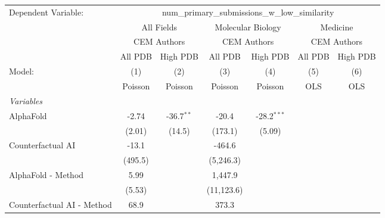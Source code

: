 \begingroup
\centering
\begin{tabular}{lcccccc}
   \tabularnewline \midrule \midrule
   Dependent Variable: & \multicolumn{6}{c}{num\_primary\_submissions\_w\_low\_similarity}\\
 & \multicolumn{2}{c}{All Fields} & \multicolumn{2}{c}{Molecular Biology} & \multicolumn{2}{c}{Medicine} \\
\cmidrule(lr){2-3} \cmidrule(lr){4-5} \cmidrule(lr){6-7}
 & \multicolumn{2}{c}{CEM Authors} & \multicolumn{2}{c}{CEM Authors} & \multicolumn{2}{c}{CEM Authors} \\
\cmidrule(lr){2-3} \cmidrule(lr){4-5} \cmidrule(lr){6-7}
 & \multicolumn{1}{c}{All PDB} & \multicolumn{1}{c}{High PDB} & \multicolumn{1}{c}{All PDB} & \multicolumn{1}{c}{High PDB} & \multicolumn{1}{c}{All PDB} & \multicolumn{1}{c}{High PDB} \\
\cmidrule(lr){2-2} \cmidrule(lr){3-3} \cmidrule(lr){4-4} \cmidrule(lr){5-5} \cmidrule(lr){6-6} \cmidrule(lr){7-7}
   Model:                                                  & (1)       & (2)          & (3)        & (4)           & (5)  & (6)\\  
                                                           &  Poisson  & Poisson      & Poisson    & Poisson       & OLS  & OLS\\  
   \midrule
   \emph{Variables}\\
   AlphaFold                                               & -2.74     & -36.7$^{**}$ & -20.4      & -28.2$^{***}$ &      &   \\   
                                                           & (2.01)    & (14.5)       & (173.1)    & (5.09)        &      &   \\   
   Counterfactual AI                                       & -13.1     &              & -464.6     &               &      &   \\   
                                                           & (495.5)   &              & (5,246.3)  &               &      &   \\   
   AlphaFold - Method                                      & 5.99      &              & 1,447.9    &               &      &   \\   
                                                           & (5.53)    &              & (11,123.6) &               &      &   \\   
   Counterfactual AI - Method                              & 68.9      &              & 373.3      &               &      &   \\   

\end{tabular}

